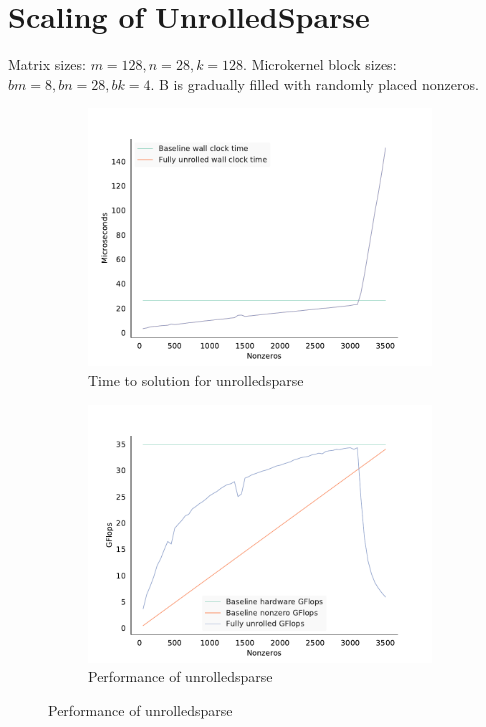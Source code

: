 \section{Scaling of UnrolledSparse}

  Matrix sizes: $m=128, n=28, k=128$.
  Microkernel block sizes: $bm=8, bn=28, bk=4$.
  B is gradually filled with randomly placed nonzeros.

  \begin{figure}[!htb]
  	\centering
    \begin{subfigure}[b]{0.8\textwidth}
      \centering
      \includegraphics[width=\textwidth]{images/fig2.pdf}
      \caption{Time to solution for unrolledsparse}
      \label{fig:unrolled_time}
    \end{subfigure}
    \begin{subfigure}[b]{0.8\textwidth}
      \centering
      \includegraphics[width=\textwidth]{images/fig3.pdf}
      \caption{Performance of unrolledsparse}
      \label{fig:unrolled_perf}
    \end{subfigure}
  \end{figure}

